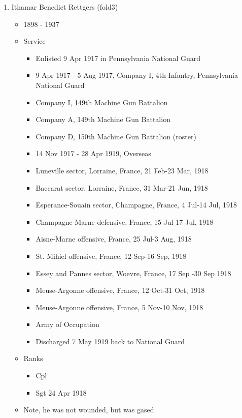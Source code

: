 \documentclass[11pt,letter]{book}
\begin{document}
\begin{enumerate}
\item Ithamar Benedict Rettgers (fold3)
\begin{itemize}
\item 1898 - 1937
\item Service
\begin{itemize}
\item Enlisted 9 Apr 1917 in Pennsylvania National Guard
\item 9 Apr 1917 - 5 Aug 1917, Company I, 4th Infantry, Pennsylvania National Guard
\item Company I, 149th Machine Gun Battalion
\item Company A, 149th Machine Gun Battalion
\item Company D, 150th Machine Gun Battalion (roster)
\item 14 Nov 1917 - 28 Apr 1919, Overseas
\item Luneville sector, Lorraine, France, 21 Feb-23 Mar, 1918
\item Baccarat sector, Lorraine, France, 31 Mar-21 Jun, 1918
\item Esperance-Souain sector, Champagne, France, 4 Jul-14 Jul, 1918
\item Champagne-Marne defensive, France, 15 Jul-17 Jul, 1918
\item Aisne-Marne offensive, France, 25 Jul-3 Aug, 1918
\item St. Mihiel offensive, France, 12 Sep-16 Sep, 1918
\item Essey and Pannes sector, Woevre, France, 17 Sep -30 Sep 1918
\item Meuse-Argonne offensive, France, 12 Oct-31 Oct, 1918
\item Meuse-Argonne offensive, France, 5 Nov-10 Nov, 1918
\item Army of Occupation
\item Discharged 7 May 1919 back to National Guard
\end{itemize}
\item Ranks
\begin{itemize}
\item Cpl
\item Sgt 24 Apr 1918
\end{itemize}
\item Note, he was not wounded, but was gased
\end{itemize}

\end{enumerate}

\end{document}
